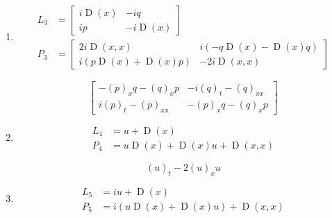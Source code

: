 \documentclass{article}
\begin{document}
\begin{enumerate}
                \item
                \begin{align}
                L_{3} &= \left[\begin{matrix}i \operatorname{D}\left(x\right) & - i q\\i p & - i \operatorname{D}\left(x\right)\end{matrix}\right] \\
                P_{3} &= \left[\begin{matrix}2 i \operatorname{D}\left(x, x\right) & i \left(- q \operatorname{D}\left(x\right) - \operatorname{D}\left(x\right) q\right)\\i \left(p \operatorname{D}\left(x\right) + \operatorname{D}\left(x\right) p\right) & - 2 i \operatorname{D}\left(x, x\right)\end{matrix}\right]
                \end{align}
                
                \begin{equation}
                \left[\begin{matrix}- (p)_{x} q - (q)_{x} p & - i (q)_{t} - (q)_{xx}\\i (p)_{t} - (p)_{xx} & - (p)_{x} q - (q)_{x} p\end{matrix}\right]
                \end{equation}
            
                \item
                \begin{align}
                L_{4} &= u + \operatorname{D}\left(x\right) \\
                P_{4} &= u \operatorname{D}\left(x\right) + \operatorname{D}\left(x\right) u + \operatorname{D}\left(x, x\right)
                \end{align}
                
                \begin{equation}
                (u)_{t} - 2 (u)_{x} u
                \end{equation}
            
                \item
                \begin{align}
                L_{5} &= i u + \operatorname{D}\left(x\right) \\
                P_{5} &= i \left(u \operatorname{D}\left(x\right) + \operatorname{D}\left(x\right) u\right) + \operatorname{D}\left(x, x\right)
                \end{align}
                

\end{enumerate}
\end{document}
